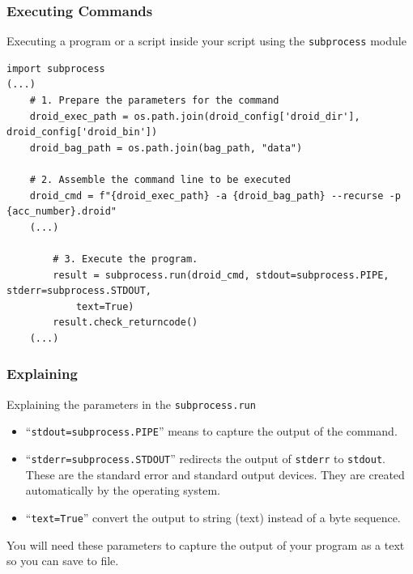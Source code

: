 \documentclass[aspectratio=169]{beamer}
\begin{document}
\begin{frame}[fragile]
\frametitle{Executing Commands}

Executing a program or a script inside your script using the \texttt{subprocess} module

\scriptsize
\begin{verbatim}
import subprocess
(...)
    # 1. Prepare the parameters for the command
    droid_exec_path = os.path.join(droid_config['droid_dir'], droid_config['droid_bin'])
    droid_bag_path = os.path.join(bag_path, "data")

    # 2. Assemble the command line to be executed
    droid_cmd = f"{droid_exec_path} -a {droid_bag_path} --recurse -p {acc_number}.droid"
    (...)

        # 3. Execute the program.
        result = subprocess.run(droid_cmd, stdout=subprocess.PIPE, stderr=subprocess.STDOUT, 
            text=True)
        result.check_returncode()
    (...)
\end{verbatim}
\normalsize
\end{frame}

\begin{frame}[fragile]
\frametitle{Explaining}

Explaining the parameters in the \texttt{subprocess.run}

\begin{itemize}
    \item ``\verb|stdout=subprocess.PIPE|'' means to capture the output of the command.
    \item ``\verb|stderr=subprocess.STDOUT|'' redirects the output of \texttt{stderr} to \texttt{stdout}. These are the standard error and standard output devices. They are created automatically by the operating system. 
    \item ``\verb|text=True|'' convert the output to string (text) instead of a byte sequence.
\end{itemize}

You will need these parameters to capture the output of your program as a text so you can save to file.

\end{frame}
\end{document}
